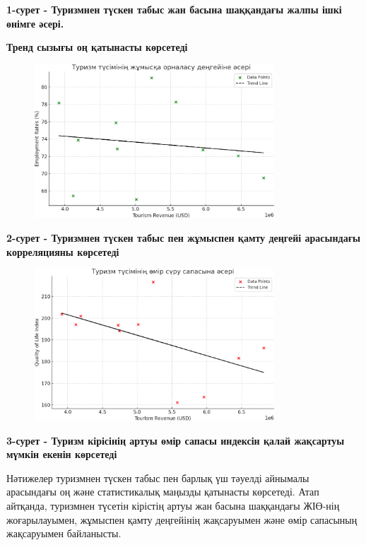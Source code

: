 {\bfseries 1-сурет - Туризмнен түскен табыс жан басына шаққандағы жалпы
ішкі өнімге әсері.}

{\bfseries Тренд сызығы оң қатынасты көрсетеді}

\begin{figure}[H]
	\centering
	\includegraphics[width=0.8\textwidth]{assets/1115}
	\caption*{}
\end{figure}

{\bfseries 2-сурет - Туризмнен түскен табыс пен жұмыспен қамту деңгейі
арасындағы корреляцияны көрсетеді}

\begin{figure}[H]
	\centering
	\includegraphics[width=0.8\textwidth]{assets/1116}
	\caption*{}
\end{figure}

{\bfseries 3-сурет - Туризм кірісінің артуы өмір сапасы индексін қалай
жақсартуы мүмкін екенін көрсетеді}

Нәтижелер туризмнен түскен табыс пен барлық үш тәуелді айнымалы
арасындағы оң және статистикалық маңызды қатынасты көрсетеді. Атап
айтқанда, туризмнен түсетін кірістің артуы жан басына шаққандағы ЖІӨ-нің
жоғарылауымен, жұмыспен қамту деңгейінің жақсаруымен және өмір сапасының
жақсаруымен байланысты.

